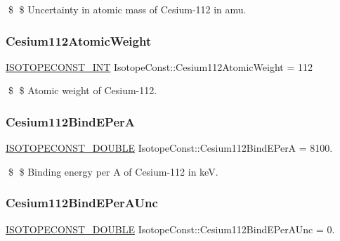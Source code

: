 \$ \$ Uncertainty in atomic mass of Cesium-\/112 in amu. \mbox{\label{group___isotope_const-_cesium-_cs112_gad3b99585539d2e70f6165ae2596e6362}} 
\subsubsection{\texorpdfstring{Cesium112\+Atomic\+Weight}{Cesium112AtomicWeight}}
{\footnotesize\ttfamily \mbox{\hyperlink{group___isotope_const-_macros_ga5f18360b3e99483a35c32d789e62621c}{I\+S\+O\+T\+O\+P\+E\+C\+O\+N\+S\+T\+\_\+\+I\+NT}} Isotope\+Const\+::\+Cesium112\+Atomic\+Weight = 112}

\$ \$ Atomic weight of Cesium-\/112. \mbox{\label{group___isotope_const-_cesium-_cs112_ga80dde8cb85f1804aa29d3517d3a96b76}} 
\subsubsection{\texorpdfstring{Cesium112\+Bind\+E\+PerA}{Cesium112BindEPerA}}
{\footnotesize\ttfamily \mbox{\hyperlink{group___isotope_const-_macros_ga8f45a7272ce02c0b4c65c44636ed719a}{I\+S\+O\+T\+O\+P\+E\+C\+O\+N\+S\+T\+\_\+\+D\+O\+U\+B\+LE}} Isotope\+Const\+::\+Cesium112\+Bind\+E\+PerA = 8100.}

\$ \$ Binding energy per A of Cesium-\/112 in keV. \mbox{\label{group___isotope_const-_cesium-_cs112_ga5c387ac9d9d3d6533cfea192651cb169}} 
\subsubsection{\texorpdfstring{Cesium112\+Bind\+E\+Per\+A\+Unc}{Cesium112BindEPerAUnc}}
{\footnotesize\ttfamily \mbox{\hyperlink{group___isotope_const-_macros_ga8f45a7272ce02c0b4c65c44636ed719a}{I\+S\+O\+T\+O\+P\+E\+C\+O\+N\+S\+T\+\_\+\+D\+O\+U\+B\+LE}} Isotope\+Const\+::\+Cesium112\+Bind\+E\+Per\+A\+Unc = 0.}

